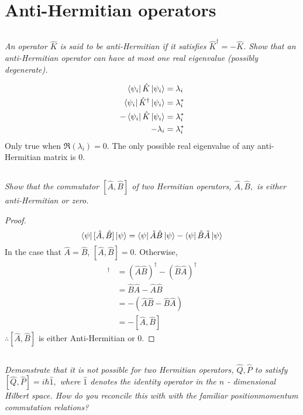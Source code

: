 \documentclass[12pt, letterpaper]{article}
\begin{document}
\newpage
\section{Anti-Hermitian operators}
\subsection{}
\textit{An operator $\hat{K}$ is said to be anti-Hermitian if it satisfies $\hat{K}^{\dagger}=-\hat{K}$. Show that an anti-Hermitian operator can have at most one real eigenvalue (possibly degenerate).}

\begin{align*}
    \bra{\psi_i} \hat K \ket{\psi_i} &= \lambda_i \\
    \bra{\psi_i} \hat{K}^\dagger \ket{\psi_i} &= \lambda_i^* \\
    -\bra{\psi_i} \hat{K} \ket{\psi_i} &= \lambda_i^* \\
    -\lambda_i &= \lambda_i^* 
\end{align*}
Only true when $\Re\left(\lambda_i\right)= 0$. The only possible real eigenvalue of any anti-Hermitian matrix is 0. 

\subsection{}
\textit{Show that the commutator $[\hat{A}, \hat{B}]$ of two Hermitian operators, $\hat{A}, \hat{B},$ is either anti-Hermitian or zero.}
\begin{proof}
\begin{equation*}
    \bra{\psi} [\hat{A}, \hat{B}] \ket{\psi} = \bra{\psi} \hat{A}\hat{B} \ket{\psi} -\bra{\psi} \hat{B}\hat{A} \ket{\psi} 
\end{equation*}
In the case that $\hat{A}= \hat{B}$, $[\hat{A}, \hat{B}] = 0$. Otherwise, 
\begin{align*}
    [\hat{A}, \hat{B}]^\dagger &= \left(\hat{A} \hat{B} \right)^\dagger - \left(\hat{B} \hat{A} \right)^\dagger \\
    &=\hat{B} \hat{A} -\hat{A} \hat{B}\\
    &=-\left(\hat{A} \hat{B}-\hat{B} \hat{A}  \right)\\
    &= - [\hat{A}, \hat{B}]
\end{align*}
$\therefore \left[\hat{A}, \hat{B}\right]$ is either Anti-Hermitian or 0.  
\end{proof}

\subsection{}
\textit{Demonstrate that it is not possible for two Hermitian operators, $\hat{Q}, \hat{P}$ to satisfy $[\hat{Q}, \hat{P}]=i \hbar \hat{1},$ where $\hat{1}$ denotes the identity operator in the $n$ - dimensional Hilbert space. How do you reconcile this with with the familiar positionmomentum commutation relations?}
\end{document}
